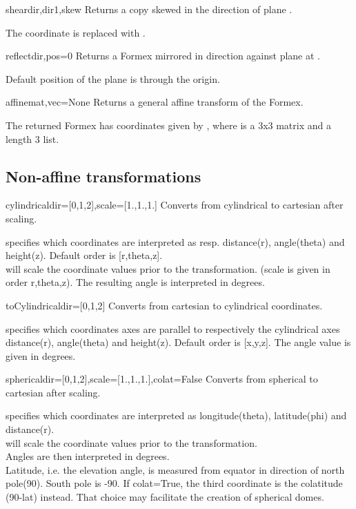 \begin{methoddesc}{shear}{dir,dir1,skew}
Returns a copy skewed in the direction  of plane .

The coordinate  is replaced with .
\end{methoddesc}

\begin{methoddesc}{reflect}{dir,pos=0}
Returns a Formex mirrored in direction  against plane at .

Default position of the plane is through the origin.
\end{methoddesc}

\begin{methoddesc}{affine}{mat,vec=None}
Returns a general affine transform of the Formex.

The returned Formex has coordinates given by , where  is a 3x3 matrix and  a length 3 list.
\end{methoddesc}


\subsection{Non-affine transformations}

\begin{methoddesc}{cylindrical}{dir=[0,1,2],scale=[1.,1.,1.]}
Converts from cylindrical to cartesian after scaling.

 specifies which coordinates are interpreted as resp. distance(r), angle(theta) and height(z). Default order is [r,theta,z].\\
 will scale the coordinate values prior to the transformation. (scale is given in order r,theta,z). The resulting angle is interpreted in degrees.
\end{methoddesc}


\begin{methoddesc}{toCylindrical}{dir=[0,1,2]}
Converts from cartesian to cylindrical coordinates.

 specifies which coordinates axes are parallel to respectively the cylindrical axes distance(r), angle(theta) and height(z). Default order is [x,y,z]. The angle value is given in degrees.
\end{methoddesc}

\begin{methoddesc}{spherical}{dir=[0,1,2],scale=[1.,1.,1.],colat=False}
Converts from spherical to cartesian after scaling.

 specifies which coordinates are interpreted as longitude(theta), latitude(phi) and distance(r).\\
 will scale the coordinate values prior to the transformation.\\
Angles are then interpreted in degrees.\\
Latitude, i.e. the elevation angle, is measured from equator in
direction of north pole(90). South pole is -90.
If colat=True, the third coordinate is the colatitude (90-lat) instead.
That choice may facilitate the creation of spherical domes.
\end{methoddesc}

